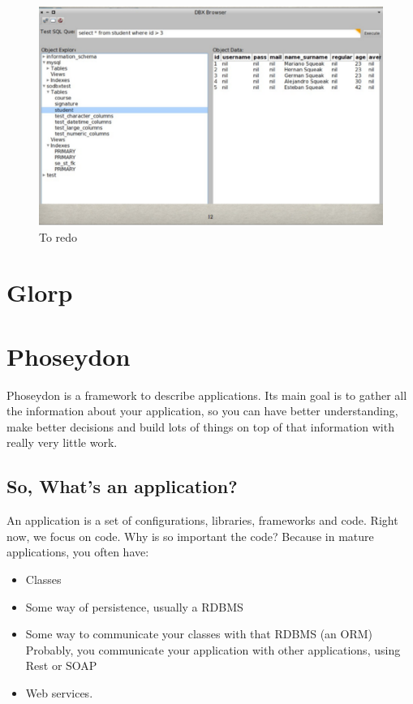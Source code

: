 \documentclass[a4paper,10pt,twoside]{book}
\begin{document}
\begin{figure}
\begin{center}
\includegraphics[width=\linewidth]{Browser}
\caption{To redo}
\end{center}
\end{figure}

\section{Glorp}



\section{Phoseydon}

Phoseydon is a framework to describe applications. Its main goal is to gather all the information about your application, so you can have better understanding, make better decisions and build lots of things on top of that information with really very little work.

\subsection{So, What's an application?}

An application is a set of configurations, libraries, frameworks and code. Right now, we focus on code. Why is so important the code? Because in mature applications, you often have:

\begin{itemize}
\item Classes
\item Some way of persistence, usually a RDBMS
\item Some way to communicate your classes with that RDBMS (an ORM)
Probably, you communicate your application with other applications, using Rest or SOAP \item Web services.
\end{itemize}
\end{document}
